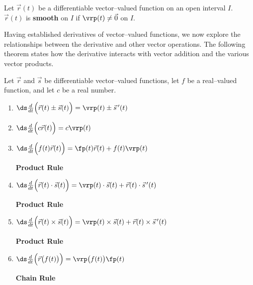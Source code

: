 {Let $\vec r(t)$ be a differentiable vector--valued function on an open interval $I$. $\vec r(t)$ is \textbf{smooth} on $I$ if $\vrp(t)\neq \vec 0$ on $I$.
}

Having established derivatives of vector--valued functions, we now explore the relationships between the derivative and other vector operations. The following theorem states how the derivative interacts with vector addition and the various vector products.\\

{Let $\vec r$ and $\vec s$ be differentiable vector--valued functions, let $f$ be a real--valued function, and let $c$ be a real number.
\begin{enumerate}
	\item $\ds \frac{d}{dt}\Big(\vec r(t) \pm \vec s(t)\Big) = \vrp(t) \pm \vec s\,'(t)$
	\item $\ds \frac{d}{dt}\Big(c\vec r(t)\Big) = c\vrp(t)$
	\item \parbox{200pt}{$\ds \frac{d}{dt}\Big(f(t)\vec r(t)\Big) = \fp(t)\vec r(t) + f(t)\vrp(t)$} \textbf{Product Rule}
	\item \parbox{200pt}{$\ds \frac{d}{dt}\Big(\vec r(t)\cdot \vec s(t) \Big) = \vrp(t)\cdot \vec s(t) + \vec r(t)\cdot \vec s\,'(t)$} \textbf{Product Rule}
	\item \parbox{200pt}{$\ds \frac{d}{dt}\Big(\vec r(t)\times \vec s(t) \Big) = \vrp(t)\times \vec s(t) + \vec r(t)\times \vec s\,'(t)$} \textbf{Product Rule}
	\item \parbox{200pt}{$\ds \frac{d}{dt}\Big(\vec r\big(f(t)\big)\Big) = \vrp\big(f(t)\big)\fp(t)$}  \textbf{Chain Rule}
	\end{enumerate}
}\\

